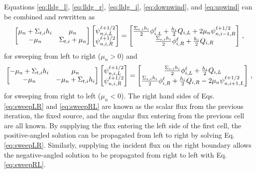 Equations \ref{eq:lldg_l}, \ref{eq:lldg_r}, \ref{eq:lldg_i}, \ref{eq:downwind}, and \ref{eq:upwind} can be combined and rewritten as 
	\begin{equation} \label{eq:sweepLR}
		\left[\begin{matrix}
			\mu_n + \Sigma_{t,i} h_i & \mu_n  \\ 
			-\mu_n & \Sigma_{t,i} + \mu_n \\ 
		\end{matrix}\right]
		\left[\begin{matrix}
			\psi_{n,i,L}^{\ell+1/2} \\ \psi_{n,i,R}^{\ell+1/2}
		\end{matrix}\right]
		= \left[\begin{matrix}
			\frac{\Sigma_{s,i}h_i}{2} \phi_{i,L}^\ell + \frac{h_i}{2} Q_{i,L} + 2\mu_n \psi_{n,i-1,R}^{\ell+1/2} \\
			\frac{\Sigma_{s,i}h_i}{2} \phi_{i,R}^\ell + \frac{h_i}{2} Q_{i,R} 
		\end{matrix}\right] \,, 
	\end{equation}
for sweeping from left to right ($\mu_n > 0$) and 
	\begin{equation} \label{eq:sweepRL}
		\left[\begin{matrix} 
			-\mu_n + \Sigma_{t,i}h_i & \mu_n \\ 
			-\mu_n & -\mu_n + \Sigma_{t,i}h_i \\ 
		\end{matrix} \right]
		\left[\begin{matrix}
			\psi_{n,i,L}^{\ell+1/2} \\ \psi_{n,i,R}^{\ell+1/2}
		\end{matrix} \right]
		= \left[\begin{matrix}
			\frac{\Sigma_{s,i}h_i}{2} \phi_{i,L}^\ell + \frac{h_i}{2} Q_{i,L} \\ 
			\frac{\Sigma_{s,i}h_i}{2} \phi_{i,R}^\ell + \frac{h_i}{2} Q_{i,R} - 2\mu_n \psi_{n,i+1,L}^{\ell+1/2}
		\end{matrix} \right]
		\,, 
	\end{equation}
for sweeping from right to left ($\mu_n < 0$). The right hand sides of Eqs. \ref{eq:sweepLR} and \ref{eq:sweepRL} are known as the scalar flux from the previous iteration, the fixed source, and the angular flux entering from the previous cell are all known. By supplying the flux entering the left side of the first cell, the positive-angled solution can be propagated from left to right by solving Eq. \ref{eq:sweepLR}. Similarly, supplying the incident flux on the right boundary allows the negative-angled solution to be propagated from right to left with Eq. \ref{eq:sweepRL}. 

